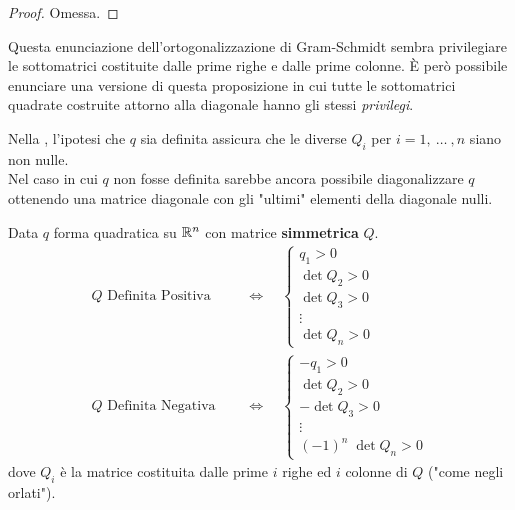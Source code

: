 \begin{appendices}
\begin{proposition}
\begin{center}
	\end{center}
	\begin{proof}
		Omessa.
	\end{proof}
	\begin{note}
		Questa enunciazione dell'ortogonalizzazione di Gram-Schmidt sembra privilegiare le sottomatrici costituite dalle prime righe e dalle prime colonne. È però possibile enunciare una versione di questa proposizione in cui tutte le sottomatrici quadrate costruite attorno alla diagonale hanno gli stessi \textit{privilegi}.
	\end{note}
\end{proposition}
\begin{observation}
	Nella , l'ipotesi che $q$ sia definita assicura che le diverse $Q_i$ per $i = 1,\:\dotsc\:,n$ siano non nulle.\\
	Nel caso in cui $q$ non fosse definita sarebbe ancora possibile diagonalizzare $q$ ottenendo una matrice diagonale con gli "ultimi" elementi della diagonale nulli.
\end{observation}
\begin{corollary}
	\label{coro:def_pos_neg_segni_Q}
	Data $q$ forma quadratica su $\mathbb{R}^n$ con matrice \textbf{simmetrica} $Q$.
	\begin{align*}
		Q \text{ Definita Positiva }
		\quad &\iff \quad
		\begin{cases}
			q_1 > 0\\
			\det Q_2 > 0\\
			\det Q_3 > 0\\
			\vdots\\
			\det Q_n > 0
		\end{cases}\\
		Q \text{ Definita Negativa }
		\quad &\iff \quad
		\begin{cases}
			-q_1 > 0\\
			\det Q_2 > 0\\
			-\det Q_3 > 0\\
			\vdots\\
			(-1)^n \; \det Q_n > 0
		\end{cases}
	\end{align*}
	dove $Q_i$ è la matrice costituita dalle prime $i$ righe ed $i$ colonne di $Q$ ("come negli orlati").


\end{corollary}
\end{appendices}
